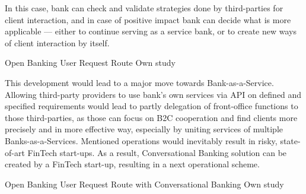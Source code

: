In this case, bank can check and validate strategies done by third-parties for client interaction, and in case of positive impact bank can decide what is more applicable — either to continue serving as a service bank, or to create new ways of client interaction by itself.

\mttable
{Open Banking User Request Route}
{Own study}
{
}

This development would lead to a major move towards Bank-as-a-Service.
Allowing third-party providers to use bank's own services via API on defined and specified requirements would lead to partly delegation of front-office functions to those third-parties, as those can focus on B2C cooperation and find clients more precisely and in more effective way, especially by uniting services of multiple Banks-as-a-Services.
Mentioned operations would inevitably result in risky, state-of-art FinTech start-ups.
As a result, Conversational Banking solution can be created by a FinTech start-up, resulting in a next operational scheme.

\mttable
{Open Banking User Request Route with Conversational Banking}
{Own study}
{
}

